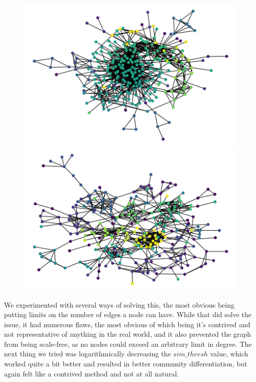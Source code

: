 \documentclass[12pt,twoside]{report}
\begin{document}
\begin{figure}[H]
\begin{center}
\begin{minipage}{0.45\linewidth}
\includegraphics[width=\linewidth]{figures/saturated_graph.png}
\end{minipage}%
\hfill
\begin{minipage}{0.45\linewidth}
\includegraphics[width=\linewidth]{figures/fixed_graph.png}
\end{minipage}
\end{center}
\end{figure}

We experimented with several ways of solving this, the most obvious being putting limits on the number of edges a node can have. While that did solve the issue, it had numerous flaws, the most obvious of which being it's contrived and not representative of anything in the real world, and it also prevented the graph from being scale-free, as no nodes could exceed an arbitrary limit in degree. The next thing we tried was logarithmically decreasing the $sim\_thresh$ value, which worked quite a bit better and resulted in better community differentiation, but again felt like a contrived method and not at all natural. \\
\end{document}
